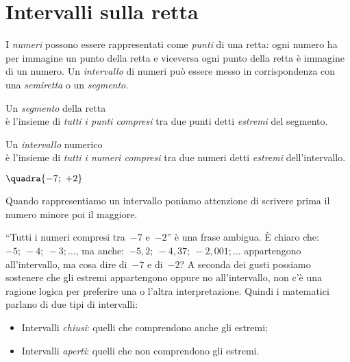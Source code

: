 \section{Intervalli sulla retta}
\label{sec:dis_intervalli}

I \emph{numeri} possono essere rappresentati come \emph{punti} di una 
retta: ogni numero ha per immagine un punto della retta e viceversa ogni 
punto della retta è immagine di un numero. 
Un \emph{intervallo} di numeri può essere messo in corrispondenza con una 
\emph{semiretta} o un \emph{segmento}.
\begin{htmulticols}{2}
Un \emph{segmento} della retta \\
è l'insieme di \emph{tutti i punti compresi} tra due punti detti 
\emph{estremi} del segmento. 
\begin{center}
\end{center}

Un \emph{intervallo} numerico \\
è l'insieme di \emph{tutti i numeri compresi} tra due numeri 
detti \emph{estremi} dell'intervallo. 

\vspace{1em}
\hspace{20mm} \(\quadra{-7;~+2}\)
\end{htmulticols}

\begin{osservazione}{}{} 
Quando rappresentiamo un intervallo poniamo 
attenzione di 
scrivere prima il numero minore poi il maggiore.
\end{osservazione}

``Tutti i numeri compresi tra~\(-7\) e~\(-2\)'' è una frase ambigua. 
È chiaro che:~\(-5;~-4;~-3; \dots\), 
ma anche:~\(-5,2;~-4,37;~-2,001; \dots\) 
appartengono all'intervallo, ma cosa dire di~\(-7\) e di~\(-2\)? 
A seconda dei gusti possiamo sostenere che gli estremi appartengono 
oppure no all'intervallo, non c'è una ragione logica per preferire una 
o l'altra interpretazione. 
Quindi i matematici parlano di due tipi di intervalli: 

\begin{itemize} [noitemsep]
 \item Intervalli \emph{chiusi}: quelli che comprendono anche gli estremi;
 \item Intervalli \emph{aperti}: quelli che non comprendono gli estremi.
\end{itemize}

